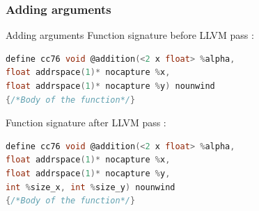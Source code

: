 \documentclass{beamer}
\begin{document}
\subsubsection{Adding arguments}
\begin{frame}[fragile]{Adding arguments}
Function signature before LLVM pass :\\ 
  \begin{lstlisting}[language=C]
define cc76 void @addition(<2 x float> %alpha, 
float addrspace(1)* nocapture %x,
float addrspace(1)* nocapture %y) nounwind 
{/*Body of the function*/}
  \end{lstlisting}
  
Function signature after LLVM pass :\\
  \begin{lstlisting}[language=C]
define cc76 void @addition(<2 x float> %alpha, 
float addrspace(1)* nocapture %x, 
float addrspace(1)* nocapture %y,
int %size_x, int %size_y) nounwind 
{/*Body of the function*/}
  \end{lstlisting}
\end{frame}
\end{document}
